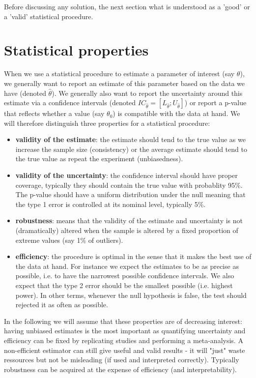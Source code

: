 \documentclass[12pt]{article}
\begin{document}
\noindent Before discussing any solution, the next section what is understood as
a 'good' or a 'valid' statistical procedure.

\clearpage

\section{Statistical properties}
\label{sec:properties}
When we use a statistical procedure to estimate a parameter of
interest (say \(\theta\)), we generally want to report an estimate of
this parameter based on the data we have (denoted
\(\widehat{\theta}\)). We generally also want to report the
uncertainty around this estimate via a confidence intervals (denoted
\(IC_{\widehat{\theta}} = [L_{\widehat{\theta}} ;
U_{\widehat{\theta}}]\)) or report a p-value that reflects whether a
value (say \(\theta_0\)) is compatible with the data at hand. We will
therefore distinguish three properties for a statistical procedure:
\begin{itemize}
\item \textbf{validity of the estimate}: the estimate should tend to the true
value as we increase the sample size (consistency) or the average
estimate should tend to the true value as repeat the
experiment (unbiasedness).
\item \textbf{validity of the uncertainty}: the confidence interval should have
proper coverage, typically they should contain the true value with
probablity 95\%. The p-value should have a uniform distribution under
the null meaning that the type 1 error is controlled at its nominal
level, typically 5\%.
\item \textbf{robustness}: means that the validity of the estimate and
uncertainty is not (dramatically) altered when the sample is altered
by a fixed proportion of extreme values (say 1\% of outliers).
\item \textbf{efficiency}: the procedure is optimal in the sense that it makes
the best use of the data at hand. \newline For instance we expect
the estimates to be as precise as possible, i.e. to have the
narrowest possible confidence intervals. We also expect that the
type 2 error should be the smallest possible (i.e. highest
power). In other terms, whenever the null hypothesis is false, the
test should rejected it as often as possible.
\end{itemize}

\bigskip

In the following we will assume that these properties are of
decreasing interest: having unbiased estimates is the most important
as quantifying uncertainty and efficiency can be fixed by
replicating studies and performing a meta-analysis. A non-efficient
estimator can still give useful and valid results - it will "just"
waste ressources but not be misleading (if used and interpreted
correctly). Typically robustness can be acquired at the expense of
efficiency (and interpretability).
\end{document}
